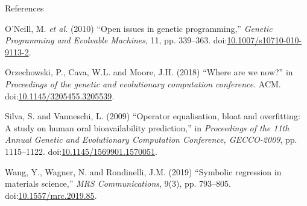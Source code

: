 \documentclass[
  ignorenonframetext,
]{beamer}
\newlength{\cslhangindent}
\newlength{\cslentryspacingunit} %
\newenvironment{CSLReferences}[2] %
 {%
  \setlength{\parindent}{0pt}
  \ifodd #1
  \let\oldpar\par
  \def\par{\hangindent=\cslhangindent\oldpar}
  \fi
  \setlength{\parskip}{#2\cslentryspacingunit}
 }%
 {}
\begin{document}
\begin{frame}[allowframebreaks]{References}
\begin{CSLReferences}{0}{0}
\leavevmode{}%
O'Neill, M. \emph{et al.} (2010) {``Open issues in genetic
programming,''} \emph{Genetic Programming and Evolvable Machines}, 11,
pp. 339--363.
doi:\href{https://doi.org/10.1007/s10710-010-9113-2}{10.1007/s10710-010-9113-2}.

\leavevmode{}%
Orzechowski, P., Cava, W.L. and Moore, J.H. (2018) {``Where are we
now?''} in \emph{Proceedings of the genetic and evolutionary computation
conference}. {ACM}.
doi:\href{https://doi.org/10.1145/3205455.3205539}{10.1145/3205455.3205539}.

\leavevmode{}%
Silva, S. and Vanneschi, L. (2009) {``Operator equalisation, bloat and
overfitting: A study on human oral bioavailability prediction,''} in
\emph{Proceedings of the 11th Annual Genetic and Evolutionary
Computation Conference, GECCO-2009}, pp. 1115--1122.
doi:\href{https://doi.org/10.1145/1569901.1570051}{10.1145/1569901.1570051}.

\leavevmode{}%
Wang, Y., Wagner, N. and Rondinelli, J.M. (2019) {``Symbolic regression
in materials science,''} \emph{MRS Communications}, 9(3), pp. 793--805.
doi:\href{https://doi.org/10.1557/mrc.2019.85}{10.1557/mrc.2019.85}.

\end{CSLReferences}
\end{frame}
\end{document}
